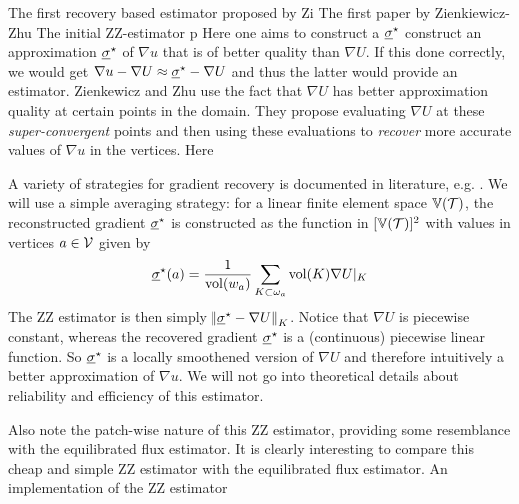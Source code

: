 \documentclass[thesis.tex]{subfiles}
\begin{document}
The first recovery based estimator proposed by Zi
The first paper by Zienkiewicz-Zhu 
The initial ZZ-estimator p
Here one aims to construct a $\underline{\sigma}^\star$ construct an approximation $\underline{\sigma}^\star$ of $\nabla u$ that is of better quality than $\nabla U$. 
If this done correctly, we would get $\nabla u - \nabla U \approx \underline{\sigma}^\star - \nabla U$ and thus the latter would provide
an estimator. Zienkewicz and Zhu use the fact that $\nabla U$ has better approximation quality
at certain points in the domain. They propose evaluating $\nabla U$ at these \emph{super-convergent} points and then using these
evaluations to \emph{recover} more accurate values of $\nabla u$ in the vertices. Here

A variety of strategies for gradient recovery is documented in literature, e.g. \cite{zienkiewicz1992superconvergent}. 
We will use a simple averaging strategy: for a linear finite element space $\mathbb{V}(\mathcal{T})$, the reconstructed gradient $\underline{\sigma}^\star$ is constructed as
the function in $[\mathbb{V}(\mathcal{T})]^2$ with values in vertices $a \in \mathcal{V}$ given by
\[
  \underline{\sigma}^\star(a) = \frac{1}{\operatorname{vol}(w_a)} \sum_{K \subset \omega_a} \operatorname{vol}(K) \nabla U|_K
\]
The ZZ estimator is then simply $\norm{\underline{\sigma}^\star - \nabla U}_K$. Notice that $\nabla U$ is piecewise constant, whereas
the recovered gradient $\underline{\sigma}^\star$ is a (continuous) piecewise linear function. So $\underline{\sigma}^\star$ is a
locally smoothened version of $\nabla U$ and therefore intuitively a better approximation of $\nabla u$. We will
not go into theoretical details about reliability and efficiency of this estimator.

Also note the patch-wise nature of this ZZ estimator, providing some resemblance with the equilibrated flux estimator.
It is clearly interesting to compare this cheap and simple ZZ estimator with the equilibrated flux estimator. An implementation
of the ZZ estimator 
\end{document}
